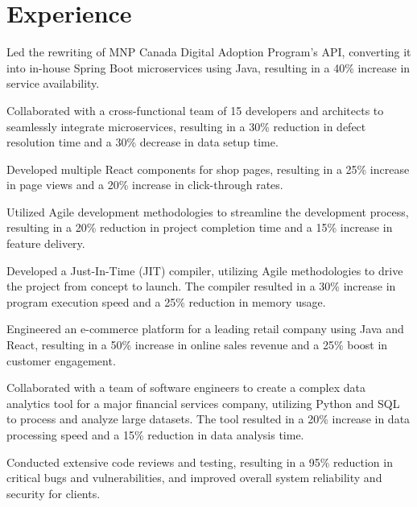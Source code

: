\documentclass[]{deedy-resume-openfont}
\begin{document}
\hfill
\begin{minipage}[t]{0.66\textwidth} 


\section{Experience}
\vspace{\topsep} %
\begin{tightemize}
\item Led the rewriting of MNP Canada Digital Adoption Program's API, converting it into in-house Spring Boot microservices using Java, resulting in a 40\% increase in service availability.
\item Collaborated with a cross-functional team of 15 developers and architects to seamlessly integrate microservices, resulting in a 30\% reduction in defect resolution time and a 30\% decrease in data setup time.
\item Developed multiple React components for shop pages, resulting in a 25\% increase in page views and a 20\% increase in click-through rates.
\item Utilized Agile development methodologies to streamline the development process, resulting in a 20\% reduction in project completion time and a 15\% increase in feature delivery.
\end{tightemize}

\begin{tightemize}
\item Developed a Just-In-Time (JIT) compiler, utilizing Agile methodologies to drive the project from concept to launch. The compiler resulted in a 30\% increase in program execution speed and a 25\% reduction in memory usage.
\item Engineered an e-commerce platform for a leading retail company using Java and React, resulting in a 50\% increase in online sales revenue and a 25\% boost in customer engagement.
\item Collaborated with a team of software engineers to create a complex data analytics tool for a major financial services company, utilizing Python and SQL to process and analyze large datasets. The tool resulted in a 20\% increase in data processing speed and a 15\% reduction in data analysis time.
\item Conducted extensive code reviews and testing, resulting in a 95\% reduction in critical bugs and vulnerabilities, and improved overall system reliability and security for clients.
\end{tightemize}


\end{minipage}
\end{document}
